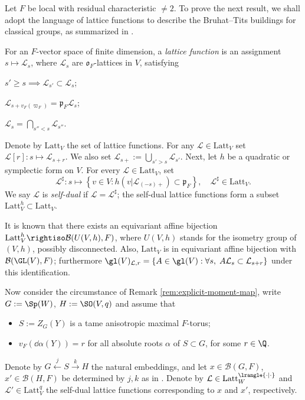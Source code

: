\documentclass[a4paper,10pt]{article}
\begin{document}
Let $F$ be local with residual characteristic $\neq 2$. To prove the next result, we shall adopt the language of lattice functions to describe the Bruhat--Tits buildings for classical groups, as summarized in \cite[\S 4]{LMS16}.

\begin{definition}
	For an $F$-vector space of finite dimension, a \emph{lattice function} is an assignment $s \mapsto \mathcal{L}_s$, where $\mathcal{L}_s$ are $\mathfrak{o}_F$-lattices in $V$, satisfying
	\begin{compactitem}
		\item $s' \geq s \implies \mathcal{L}_{s'} \subset \mathcal{L}_s$;
		\item $\mathcal{L}_{s + v_F(\varpi_F)} = \mathfrak{p}_F \mathcal{L}_s$;
		\item $\mathcal{L}_s = \bigcap_{s'' < s} \mathcal{L}_{s''}$.
	\end{compactitem}
	Denote by $\text{Latt}_V$ the set of lattice functions. For any $\mathcal{L} \in \text{Latt}_V$ set $\mathcal{L}[r]: s \mapsto \mathcal{L}_{s+r}$. We also set $\mathcal{L}_{s+} := \bigcup_{s' > s} \mathcal{L}_{s'}$.	Next, let $h$ be a quadratic or symplectic form on $V$. For every $\mathcal{L} \in \text{Latt}_V$, set
	\[ \mathcal{L}^\sharp: s \mapsto \left\{ v \in V: h\left( v | \mathcal{L}_{(-s)+} \right) \subset \mathfrak{p}_F \right\}, \quad \mathcal{L}^\sharp \in \text{Latt}_V. \]
	We say $\mathcal{L}$ is \emph{self-dual} if $\mathcal{L} = \mathcal{L}^\sharp$; the self-dual lattice functions form a subset $\text{Latt}_V^h \subset \text{Latt}_V$.
\end{definition}

It is known that there exists an equivariant affine bijection $\text{Latt}_V^h \rightiso \mathcal{B}(U(V,h), F)$, where $U(V,h)$ stands for the isometry group of $(V,h)$, possibly disconnected. Also, $\text{Latt}_V$ is in equivariant affine bijection with $\mathcal{B}(\GL(V), F)$; furthermore $\gl(V)_{\mathcal{L}, r} = \left\{ A \in \gl(V) : \forall s, \; A\mathcal{L}_s \subset \mathcal{L}_{s+r} \right\}$ under this identification.

Now consider the circumstance of Remark \ref{rem:explicit-moment-map}, write $G := \Sp(W)$, $H := \SO(V,q)$ and assume that
\begin{itemize}
	\item $S := Z_G(Y)$ is a tame anisotropic maximal $F$-torus;
	\item $v_F(\dd\alpha(Y)) = r$ for all absolute roots $\alpha$ of $S \subset G$, for some $r \in \Q$.
\end{itemize}
Denote by $G \xleftarrow{j} S \xrightarrow{k} H$ the natural embeddings, and let $x \in \mathcal{B}(G, F)$, $x' \in \mathcal{B}(H, F)$ be determined by $j,k$ as in \cite{Pra01}. Denote by $\mathcal{L} \in \mathrm{Latt}^{\lrangle{\cdot|\cdot}}_W$ and $\mathcal{L}' \in \mathrm{Latt}^q_V$ the self-dual lattice functions corresponding to $x$ and $x'$, respectively.
\end{document}
